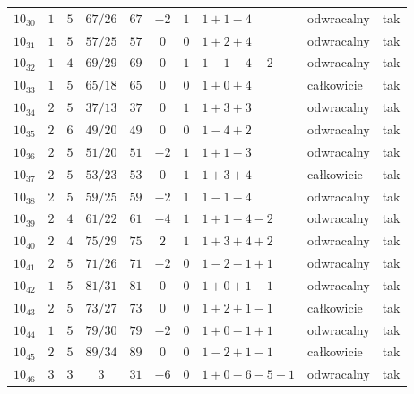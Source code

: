 \begin{longtable}{lccccccllc}
$10_{30}$   &  $1$     &  $5$  &  $67/26$  &  $67$   &  $-2$  &  $1$  &  $1+1-4$        &  odwracalny  &  tak  \\
$10_{31}$   &  $1$     &  $5$  &  $57/25$  &  $57$   &  $0$   &  $0$  &  $1+2+4$        &  odwracalny  &  tak  \\
$10_{32}$   &  $1$     &  $4$  &  $69/29$  &  $69$   &  $0$   &  $1$  &  $1-1-4-2$      &  odwracalny  &  tak  \\
$10_{33}$   &  $1$     &  $5$  &  $65/18$  &  $65$   &  $0$   &  $0$  &  $1+0+4$        &  całkowicie  &  tak  \\
$10_{34}$   &  $2$     &  $5$  &  $37/13$  &  $37$   &  $0$   &  $1$  &  $1+3+3$        &  odwracalny  &  tak  \\
$10_{35}$   &  $2$     &  $6$  &  $49/20$  &  $49$   &  $0$   &  $0$  &  $1-4+2$        &  odwracalny  &  tak  \\
$10_{36}$   &  $2$     &  $5$  &  $51/20$  &  $51$   &  $-2$  &  $1$  &  $1+1-3$        &  odwracalny  &  tak  \\
$10_{37}$   &  $2$     &  $5$  &  $53/23$  &  $53$   &  $0$   &  $1$  &  $1+3+4$        &  całkowicie  &  tak  \\
$10_{38}$   &  $2$     &  $5$  &  $59/25$  &  $59$   &  $-2$  &  $1$  &  $1-1-4$        &  odwracalny  &  tak  \\
$10_{39}$   &  $2$     &  $4$  &  $61/22$  &  $61$   &  $-4$  &  $1$  &  $1+1-4-2$      &  odwracalny  &  tak  \\
$10_{40}$   &  $2$     &  $4$  &  $75/29$  &  $75$   &  $2$   &  $1$  &  $1+3+4+2$      &  odwracalny  &  tak  \\
$10_{41}$   &  $2$     &  $5$  &  $71/26$  &  $71$   &  $-2$  &  $0$  &  $1-2-1+1$      &  odwracalny  &  tak  \\
$10_{42}$   &  $1$     &  $5$  &  $81/31$  &  $81$   &  $0$   &  $0$  &  $1+0+1-1$      &  odwracalny  &  tak  \\
$10_{43}$   &  $2$     &  $5$  &  $73/27$  &  $73$   &  $0$   &  $0$  &  $1+2+1-1$      &  całkowicie  &  tak  \\
$10_{44}$   &  $1$     &  $5$  &  $79/30$  &  $79$   &  $-2$  &  $0$  &  $1+0-1+1$      &  odwracalny  &  tak  \\
$10_{45}$   &  $2$     &  $5$  &  $89/34$  &  $89$   &  $0$   &  $0$  &  $1-2+1-1$      &  całkowicie  &  tak  \\
$10_{46}$   &  $3$     &  $3$  &  $3$      &  $31$   &  $-6$  &  $0$  &  $1+0-6-5-1$    &  odwracalny  &  tak  \\

\end{longtable}
